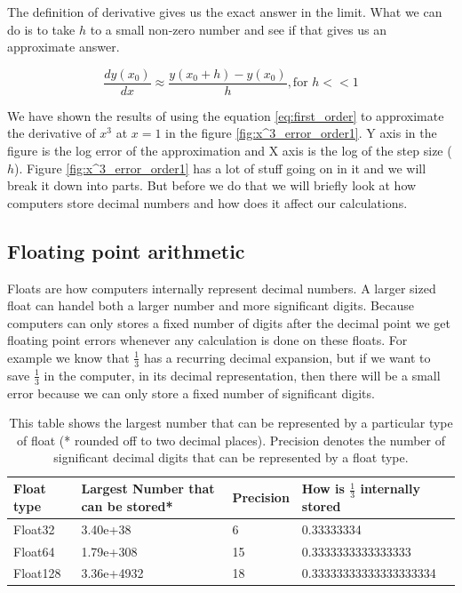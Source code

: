 The definition of derivative gives us the exact answer in the limit. What we can do is to take $h$ to a small non-zero number and see if that gives us an approximate answer.

\begin{equation}
    \frac{dy(x_0)}{dx} \approx \frac{y(x_0 + h) - y(x_0)}{h} , \text{for } h << 1
\end{equation}\label{eq:first_order}

We have shown the results of using the equation \ref{eq:first_order} to approximate the derivative of $x^3$ at $x=1$ in the figure \ref{fig:x^3_error_order1}. Y axis in the figure is the log error of the approximation and X axis is the log of the  step size ($h$). Figure \ref{fig:x^3_error_order1} has a lot of stuff going on in it and we will break it down into parts. But before we do that we will briefly look at how computers store decimal numbers and how does it affect our calculations.

\subsection{Floating point arithmetic}

 Floats are how computers internally represent decimal numbers. A larger sized float can handel both a larger number and more significant digits. Because computers can only stores a fixed number of digits after the decimal point we get  floating point errors whenever any calculation is done on these floats. For example we know that $\frac{1}{3}$ has a recurring decimal expansion, but if we want to save $\frac{1}{3}$ in the computer, in its decimal representation, then there will be a small error because we can only store a fixed number of significant digits.




\begin{table}[hbt!]
    \centering
    \begin{tabular}{||m{2cm} | m{3.2cm} | m{1.5cm} | m{4.5cm}||}
        \hline
        Float type & Largest Number that can be stored* & Precision & How is $\frac{1}{3}$ internally stored \\ [0.5ex]
        \hline\hline

        Float32    & 3.40e+38                           & 6         & 0.33333334                             \\

        Float64    & 1.79e+308                          & 15        & 0.3333333333333333                     \\

        Float128   & 3.36e+4932                         & 18        & 0.33333333333333333334                 \\ [1ex]
        \hline
    \end{tabular}
    \caption{This table shows the largest number that can be represented by a particular type of float (* rounded off to two decimal places). Precision denotes the number of significant decimal digits that can be represented by a float type.}
    \label{table:floats}
\end{table}

